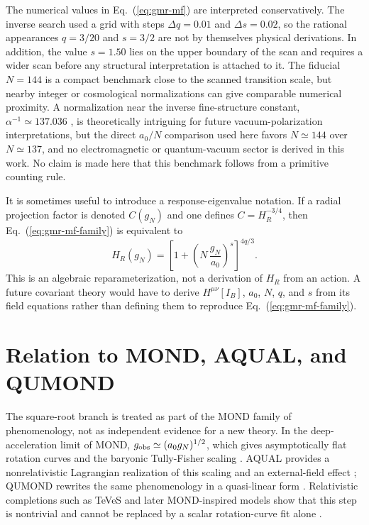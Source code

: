 ﻿\documentclass[twocolumn]{aastex631}
\begin{document}
The numerical values in Eq.~(\ref{eq:gmr-mf}) are interpreted conservatively.  The inverse search used a grid with steps $\Delta q=0.01$ and $\Delta s=0.02$, so the rational appearances $q=3/20$ and $s=3/2$ are not by themselves physical derivations.  In addition, the value $s=1.50$ lies on the upper boundary of the scan and requires a wider scan before any structural interpretation is attached to it.  The fiducial $N=144$ is a compact benchmark close to the scanned transition scale, but nearby integer or cosmological normalizations can give comparable numerical proximity.  A normalization near the inverse fine-structure constant, $\alpha^{-1}\simeq137.036$ \citep{CODATA2022Constants}, is theoretically intriguing for future vacuum-polarization interpretations, but the direct $a_0/N$ comparison used here favors $N\simeq144$ over $N\simeq137$, and no electromagnetic or quantum-vacuum sector is derived in this work.  No claim is made here that this benchmark follows from a primitive counting rule.

It is sometimes useful to introduce a response-eigenvalue notation.  If a radial projection factor is denoted $C(g_N)$ and one defines $C=H_R^{-3/4}$, then Eq.~(\ref{eq:gmr-mf-family}) is equivalent to
\begin{equation}
H_R(g_N)=
\left[1+\left(N\,\frac{g_N}{a_0}\right)^s\right]^{4q/3}.
\end{equation}
This is an algebraic reparameterization, not a derivation of $H_R$ from an action.  A future covariant theory would have to derive $H^{\mu\nu}[I_B]$, $a_0$, $N$, $q$, and $s$ from its field equations rather than defining them to reproduce Eq.~(\ref{eq:gmr-mf-family}).


\section{Relation to MOND, AQUAL, and QUMOND}
The square-root branch is treated as part of the MOND family of phenomenology, not as independent evidence for a new theory.  In the deep-acceleration limit of MOND, $g_{\rm obs}\simeq (a_0g_N)^{1/2}$, which gives asymptotically flat rotation curves and the baryonic Tully-Fisher scaling \citep{Milgrom1983,FamaeyMcGaugh2012}.  AQUAL provides a nonrelativistic Lagrangian realization of this scaling and an external-field effect \citep{BekensteinMilgrom1984}; QUMOND rewrites the same phenomenology in a quasi-linear form \citep{Milgrom2010QUMOND}.  Relativistic completions such as TeVeS and later MOND-inspired models show that this step is nontrivial and cannot be replaced by a scalar rotation-curve fit alone \citep{Bekenstein2004,SkordisZlosnik2021}.
\end{document}

